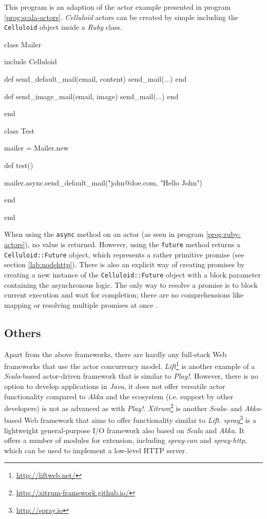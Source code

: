 \begin{program}
  \caption{This program is an adaption of the actor example presented in program \ref{prog:scala-actors}. \textit{Celluloid} actors can be created by simple including the \texttt{Celluloid} object inside a \textit{Ruby} class.}
  \label{prog:ruby-actors}
  \begin{JavaCode}

class Mailer
    
    include Celluloid

    def send_default_mail(email, content)
        send_mail(...)
    end

    def send_image_mail(email, image)
	    send_mail(...)
    end

end

class Test

    mailer = Mailer.new

    def test()
    
        mailer.async.send_default_mail("john@doe.com, "Hello John")

    end   

end
  \end{JavaCode}
\end{program}

When using the \texttt{async} method on an actor (as seen in program \ref{prog:ruby-actors}), no value is returned. However, using the \texttt{future} method returns a \texttt{Celluloid::Future} object, which represents a rather primitive promise (see section \ref{lab:nodehttp}). There is also an explicit way of creating promises by creating a new instance of the \texttt{Celluloid::Future} object with a block parameter containing the asynchronous logic. The only way to resolve a promise is to block current execution and wait for completion; there are no comprehensions like mapping or resolving multiple promises at once \cite{Arcieri2012}.

\subsection{Others}
Apart from the above frameworks, there are hardly any full-stack Web frameworks that use the actor concurrency model. \textit{Lift}\footnote{\url{http://liftweb.net/}} is another example of a \textit{Scala}-based actor-driven framework that is similar to \textit{Play!}. However, there is no option to develop applications in \textit{Java}, it does not offer versatile actor functionality compared to \textit{Akka} and the ecosystem (i.e. support by other developers) is not as advanced as with \textit{Play!}. \textit{Xitrum}\footnote{\url{http://xitrum-framework.github.io/}} is another \textit{Scala}- and \textit{Akka}-based Web framework that aims to offer functionality similar to \textit{Lift}. \textit{spray}\footnote{\url{http://spray.io}} is a lightweight general-purpose I/O framework also based on \textit{Scala} and \textit{Akka}. It offers a number of modules for extension, including \textit{spray-can} and \textit{spray-http}, which can be used to implement a low-level HTTP server.





